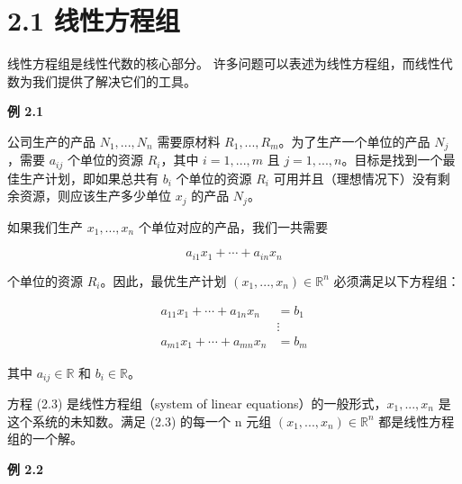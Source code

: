 \section*{2.1 线性方程组}
\label{sec:2.1}

线性方程组是线性代数的核心部分。 许多问题可以表述为线性方程组，而线性代数为我们提供了解决它们的工具。

\begin{notebox}
\textbf{例 2.1}
\end{notebox}

\begin{notebox}
公司生产的产品 $ N_1,...,N_n $ 需要原材料 $ R_1,...,R_m $。为了生产一个单位的产品 $ N_j $，需要 $ a_{ij} $ 个单位的资源 $ R_i $，其中 $ i = 1,...,m $ 且 $ j = 1,...,n $。目标是找到一个最佳生产计划，即如果总共有 $ b_i $ 个单位的资源 $ R_i $ 可用并且（理想情况下）没有剩余资源，则应该生产多少单位 $ x_j $ 的产品 $ N_j $。
\end{notebox}

\begin{notebox}
如果我们生产 $ x_1,...,x_n $ 个单位对应的产品，我们一共需要

\begin{equation}
a_{i1}x_1 + \cdots + a_{in}x_n
\tag{2.2}\label{eq:2-2}
\end{equation}

个单位的资源 $ R_i $。因此，最优生产计划 $ (x_1,...,x_n) \in \mathbb{R}^n $ 必须满足以下方程组：

\begin{equation}
\begin{array}{clr}
  a_{11}x_1 + \cdots + a_{1n}x_n & = b_1 \\
        & \vdots \\
  a_{m1}x_1 +  \cdots + a_{mn}x_n & = b_m
\end{array}
\tag{2.3}\label{eq:2-3}
\end{equation}

其中 $ a_{ij} \in \mathbb{R} $ 和 $ b_i \in \mathbb{R} $。
\end{notebox}

\begin{notebox}
方程 (2.3) 是线性方程组（system of linear equations）的一般形式，$ x_1,...,x_n $ 是这个系统的未知数。满足 (2.3) 的每一个 n 元组 $ (x_1,...,x_n) \in \mathbb{R}^n $ 都是线性方程组的一个解。
\end{notebox}

\begin{notebox}
\textbf{例 2.2}
\end{notebox}

